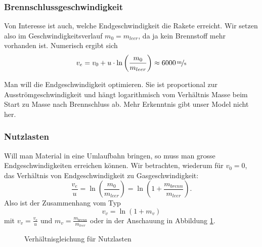 \documentclass[%
11pt,%
twoside,%
titlepage,%
german,%
headsepline%
]{scrartcl}
\begin{document}
\subsubsection{Brennschlussgeschwindigkeit}

Von Interesse ist auch, welche Endgeschwindigkeit die Rakete erreicht. Wir setzen also im Geschwindigkeitsverlauf $m_0=m_{leer}$, da ja kein Brennstoff mehr vorhanden ist. Numerisch ergibt sich
$$v_e=v_0+u\cdot\ln\left(\frac{m_0}{m_{leer}}\right)\approx\unitfrac[6000]{m}{s}$$

Man will die Endgeschwindigkeit optimieren. Sie ist proportional zur Ausstr\"omgeschwindigkeit und h\"angt logarithmisch vom Verh\"altnis Masse beim Start zu Masse nach Brennschluss ab. Mehr Erkenntnis gibt unser Model nicht her.

\subsubsection{Nutzlasten}

Will man Material in eine Umlaufbahn bringen, so muss man grosse Endgeschwindigkeiten erreichen k\"onnen. Wir betrachten, wiederum f\"ur $v_0=0$, das Verh\"altnis von Endgeschwindigkeit zu Gasgeschwindigkeit:
$$\frac{v_e}{u}=\ln\left(\frac{m_0}{m_{leer}}\right)=\ln\left(1+\frac{m_{brenn}}{m_{leer}}\right).$$
Also ist der Zusammenhang vom Typ
$$v_v=\ln(1+m_v)$$
mit $v_v=\frac{v_e}{u}$ und $m_v=\frac{m_{brenn}}{m_{leer}}$ oder in der Anschauung in Abbildung \ref{raketeverhaeltnis}.

\begin{figure}
\begin{center}
\end{center}
\caption{Verh\"altnisgleichung f\"ur Nutzlasten}\label{raketeverhaeltnis}
\end{figure}
\end{document}
